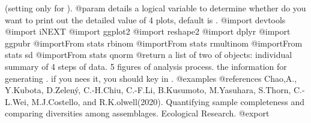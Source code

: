 \documentclass[]{article}
\begin{document}
(setting only for ).\cr
@param details a logical variable to determine whether do you want to
print out the detailed value of 4 plots, default is .\cr
@import devtools @import iNEXT @import ggplot2 @import reshape2 @import
dplyr @import ggpubr @importFrom stats rbinom @importFrom stats
rmultinom @importFrom stats sd @importFrom stats qnorm @return a list of
two of objects: \cr\cr
{} individual summary of 4 steps of data. \cr\cr
{} 5 figures of analysis process. \cr\cr
{} the information for generating . \cr
if you nees it, you should key in . \cr\cr
@examples  @references Chao,A., Y.Kubota, D.Zelený, C.-H.Chiu, C.-F.Li,
B.Kusumoto, M.Yasuhara, S.Thorn, C.-L.Wei, M.J.Costello, and
R.K.olwell(2020). Quantifying sample completeness and comparing
diversities among assemblages. Ecological Research. @export
\end{document}
